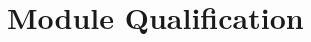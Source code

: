 \documentclass[0_Bericht]{subfiles}
\begin{document}
	\section{Module Qualification}
		\label{sec:ModuleQualification}
		\subsection{}
			
			
\end{document}
